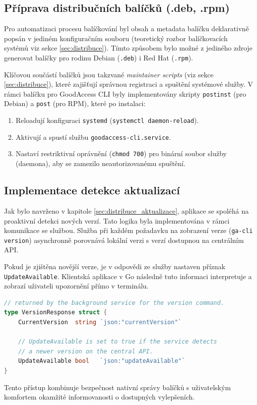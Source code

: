 \subsection{Příprava distribučních balíčků (.deb, .rpm)}
Pro automatizaci procesu balíčkování byl obsah a metadata balíčku deklarativně popsán v jediném konfiguračním souboru (teoretický rozbor balíčkovacích systémů viz sekce \ref{sec:distribuce}). Tímto způsobem bylo možné z jediného zdroje generovat balíčky pro rodinu Debian (\texttt{.deb}) i Red Hat (\texttt{.rpm}).

Klíčovou součástí balíčků jsou takzvané \textit{maintainer scripts} (viz sekce \ref{sec:distribuce}), které zajišťují správnou registraci a spuštění systémové služby. V rámci balíčku pro GoodAccess CLI byly implementovány skripty \texttt{postinst} (pro Debian) a \texttt{post} (pro RPM), které po instalaci:
\begin{enumerate}
    \item Reloadují konfiguraci \texttt{systemd} (\texttt{systemctl daemon-reload}).
    \item Aktivují a spustí službu \texttt{goodaccess-cli.service}.
    \item Nastaví restriktivní oprávnění (\texttt{chmod 700}) pro binární soubor služby (daemona), aby se zamezilo neautorizovanému spuštění.
\end{enumerate}

\subsection{Implementace detekce aktualizací}
Jak bylo navrženo v kapitole \ref{sec:distribuce_aktualizace}, aplikace se spoléhá na proaktivní detekci nových verzí. Tato logika byla implementována v rámci komunikace se službou. Služba při každém požadavku na zobrazení verze (\texttt{ga-cli version}) asynchronně porovnává lokální verzi s verzí dostupnou na centrálním API.

Pokud je zjištěna novější verze, je v odpovědi ze služby nastaven příznak \texttt{UpdateAvailable}. Klientská aplikace v Go následně tuto informaci interpretuje a zobrazí uživateli upozornění přímo v terminálu.

\noindent\begin{minipage}{\linewidth}
\begin{lstlisting}[language=Go, stringstyle=\itshape]
// returned by the background service for the version command.
type VersionResponse struct {
	CurrentVersion  string `json:"currentVersion"`
	
	// UpdateAvailable is set to true if the service detects 
	// a newer version on the central API.
	UpdateAvailable bool   `json:"updateAvailable"`
}
\end{lstlisting}
\end{minipage}

Tento přístup kombinuje bezpečnost nativní správy balíčků s uživatelským komfortem okamžité informovanosti o dostupných vylepšeních.

